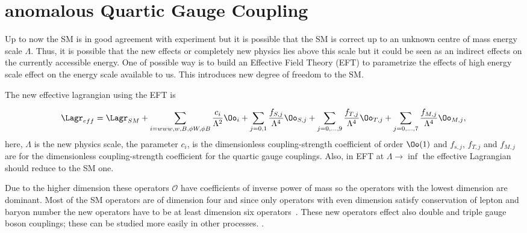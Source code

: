 % 


\section{anomalous Quartic Gauge Coupling} %
\label{sec:anomalous_quartic_gauge_coupling}
Up to now the SM is in good agreement with experiment but it is possible that the SM is correct up to an unknown centre of mass energy scale $\Lambda$.
Thus, it is possible that the new effects or completely new physics lies above this scale but it could be seen as an indirect effects on the currently accessible energy.
One of possible way is to build an Effective Field Theory (EFT) to parametrize the effects of high energy scale effect on the energy scale available to us. This introduces new degree of freedom to the SM.

The new effective lagrangian using the EFT is

\begin{equation}
    \Lagr_{eff} = \Lagr_{SM} + \sum_{i=www,w,B, \phi W, \phi B} \frac{c_i}{\Lambda^2} {\Oo}_i + \sum_{j=0,1}\frac{f_{S,j}}{\Lambda^4} \Oo_{S,j} + \sum_{j=0,...,9}\frac{f_{T,j}}{\Lambda^4} \Oo_{T,j}  + \sum_{j=0,...,7}\frac{f_{M,j}}{\Lambda^4} \Oo_{M,j} ,
\end{equation}
here, $\Lambda$ is the new physics scale, the parameter $c_i$, is the dimensionless coupling-strength coefficient of order $\Oo(1)$ and $f_{s,j}$, $f_{T,j}$ and $f_{M,j}$ are for the dimensionless coupling-strength coefficient for the quartic gauge couplings. Also, in EFT at $\Lambda \rightarrow \inf$ the effective Lagrangian should reduce to the SM one.

Due to the higher dimension these operators $\mathcal{O}$ have coefficients of inverse power of mass so the operators with the lowest dimension are dominant. Most of the SM operators are of dimension four and since only operators with even dimension satisfy conservation of lepton and baryon number the new operators have to be at least dimension six operators~\cite{Degrande2013a}. 
These new operators effect also double and triple gauge boson couplings; these can be studied more easily in other processes. .

